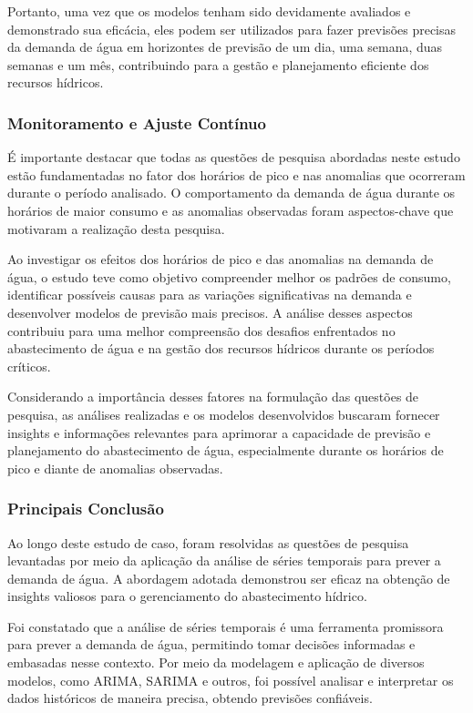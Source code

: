 Portanto, uma vez que os modelos tenham sido devidamente avaliados e demonstrado sua eficácia, eles podem ser utilizados para fazer previsões precisas da demanda de água em horizontes de previsão de um dia, uma semana, duas semanas e um mês, contribuindo para a gestão e planejamento eficiente dos recursos hídricos.

\subsubsection{Monitoramento e Ajuste Cont\'inuo}


É importante destacar que todas as questões de pesquisa abordadas neste estudo estão fundamentadas no fator dos horários de pico e nas anomalias que ocorreram durante o período analisado. O comportamento da demanda de água durante os horários de maior consumo e as anomalias observadas foram aspectos-chave que motivaram a realização desta pesquisa.

Ao investigar os efeitos dos horários de pico e das anomalias na demanda de água, o estudo teve como objetivo compreender melhor os padrões de consumo, identificar possíveis causas para as variações significativas na demanda e desenvolver modelos de previsão mais precisos. A análise desses aspectos contribuiu para uma melhor compreensão dos desafios enfrentados no abastecimento de água e na gestão dos recursos hídricos durante os períodos críticos.

Considerando a importância desses fatores na formulação das questões de pesquisa, as análises realizadas e os modelos desenvolvidos buscaram fornecer insights e informações relevantes para aprimorar a capacidade de previsão e planejamento do abastecimento de água, especialmente durante os horários de pico e diante de anomalias observadas.

\subsubsection{Principais Conclus\~ao}


Ao longo deste estudo de caso, foram resolvidas as questões de pesquisa levantadas por meio da aplicação da análise de séries temporais para prever a demanda de água. A abordagem adotada demonstrou ser eficaz na obtenção de insights valiosos para o gerenciamento do abastecimento hídrico.

Foi constatado que a análise de séries temporais é uma ferramenta promissora para prever a demanda de água, permitindo tomar decisões informadas e embasadas nesse contexto. Por meio da modelagem e aplicação de diversos modelos, como ARIMA, SARIMA e outros, foi possível analisar e interpretar os dados históricos de maneira precisa, obtendo previsões confiáveis.

